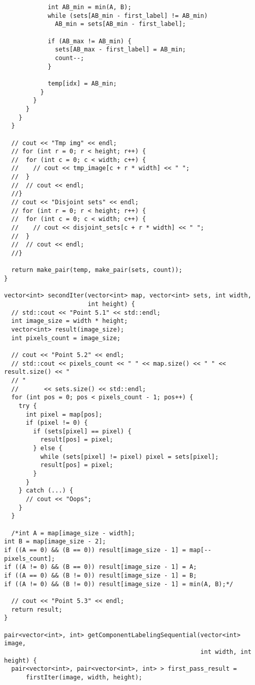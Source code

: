 \documentclass{report}
\begin{document}
\begin{lstlisting}
            int AB_min = min(A, B);
            while (sets[AB_min - first_label] != AB_min)
              AB_min = sets[AB_min - first_label];

            if (AB_max != AB_min) {
              sets[AB_max - first_label] = AB_min;
              count--;
            }

            temp[idx] = AB_min;
          }
        }
      }
    }
  }

  // cout << "Tmp img" << endl;
  // for (int r = 0; r < height; r++) {
  //  for (int c = 0; c < width; c++) {
  //    // cout << tmp_image[c + r * width] << " ";
  //  }
  //  // cout << endl;
  //}
  // cout << "Disjoint sets" << endl;
  // for (int r = 0; r < height; r++) {
  //  for (int c = 0; c < width; c++) {
  //    // cout << disjoint_sets[c + r * width] << " ";
  //  }
  //  // cout << endl;
  //}

  return make_pair(temp, make_pair(sets, count));
}

vector<int> secondIter(vector<int> map, vector<int> sets, int width,
                       int height) {
  // std::cout << "Point 5.1" << std::endl;
  int image_size = width * height;
  vector<int> result(image_size);
  int pixels_count = image_size;

  // cout << "Point 5.2" << endl;
  // std::cout << pixels_count << " " << map.size() << " " << result.size() << "
  // "
  //       << sets.size() << std::endl;
  for (int pos = 0; pos < pixels_count - 1; pos++) {
    try {
      int pixel = map[pos];
      if (pixel != 0) {
        if (sets[pixel] == pixel) {
          result[pos] = pixel;
        } else {
          while (sets[pixel] != pixel) pixel = sets[pixel];
          result[pos] = pixel;
        }
      }
    } catch (...) {
      // cout << "Oops";
    }
  }

  /*int A = map[image_size - width];
int B = map[image_size - 2];
if ((A == 0) && (B == 0)) result[image_size - 1] = map[--pixels_count];
if ((A != 0) && (B == 0)) result[image_size - 1] = A;
if ((A == 0) && (B != 0)) result[image_size - 1] = B;
if ((A != 0) && (B != 0)) result[image_size - 1] = min(A, B);*/

  // cout << "Point 5.3" << endl;
  return result;
}

pair<vector<int>, int> getComponentLabelingSequential(vector<int> image,
                                                      int width, int height) {
  pair<vector<int>, pair<vector<int>, int> > first_pass_result =
      firstIter(image, width, height);


\end{lstlisting}
\end{document}
